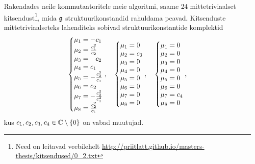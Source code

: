 Rakendades neile kommutaatoritele meie algoritmi, saame $24$
mittetriviaalset kitsendust\footnote{Need on leitavad veebilehelt
\url{http://priitlatt.github.io/masters-thesis/kitsendused/0_2.txt}},
mida $\mathfrak{g}$ struktuurikonstandid rahuldama peavad. Kitsenduste
mittetriviaalseteks lahenditeks sobivad struktuurikonstantide komplektid
\renewcommand\arraystretch{1.3}
\begin{align*}
    \left\{ \begin{matrix*}[l]
        \m_1 = -c_1 \\
        \m_2 = \frac{c_1^2}{c_2} \\
        \m_3 = -c_2 \\
        \m_4 = c_1 \\
        \m_5 = -\frac{c_2^2}{c_1} \\
        \m_6 = c_2 \\
        \m_7 = -\frac{c_2^3}{c_1^2} \\
        \m_8 = \frac{c_2^2}{c_1} \\
    \end{matrix*} \right.,
    \quad
    \left\{ \begin{matrix*}[l]
        \m_1 = 0 \\
        \m_2 = c_3 \\
        \m_3 = 0 \\
        \m_4 = 0 \\
        \m_5 = 0 \\
        \m_6 = 0 \\
        \m_7 = 0 \\
        \m_8 = 0 \\
    \end{matrix*} \right.,
    \quad
    \left\{ \begin{matrix*}[l]
        \m_1 = 0 \\
        \m_2 = 0 \\
        \m_3 = 0 \\
        \m_4 = 0 \\
        \m_5 = 0 \\
        \m_6 = 0 \\
        \m_7 = c_4 \\
        \m_8 = 0 \\
    \end{matrix*} \right.,
\end{align*}
\renewcommand\arraystretch{1}
kus $c_1, c_2, c_3, c_4 \in \mathbb{C} \setminus \{0\}$ on vabad muutujad.

